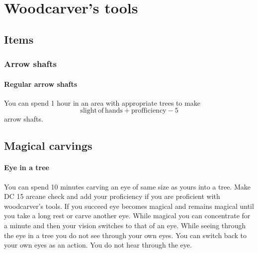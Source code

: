 \chapter{Woodcarver's tools}

\section{Items}

\subsection{Arrow shafts}

\subsubsection{Regular arrow shafts}

You can spend 1 hour in an area with appropriate trees to make $$\mathrm{slight\,of\,hands} + \mathrm{profficiency} - 5$$ arrow shafts.

\section{Magical carvings}

\subsubsection{Eye in a tree}

You can spend 10 minutes carving an eye of same size as yours into a tree. Make DC 15 arcane check and add your proficiency if you are proficient with woodcarver's tools. If you succeed eye becomes magical and remains magical until you take a long rest or carve another eye. While magical you can concentrate for a minute and then your vision switches to that of an eye. While seeing through the eye in a tree you do not see through your own eyes. You can switch back to your own eyes as an action. You do not hear through the eye.
